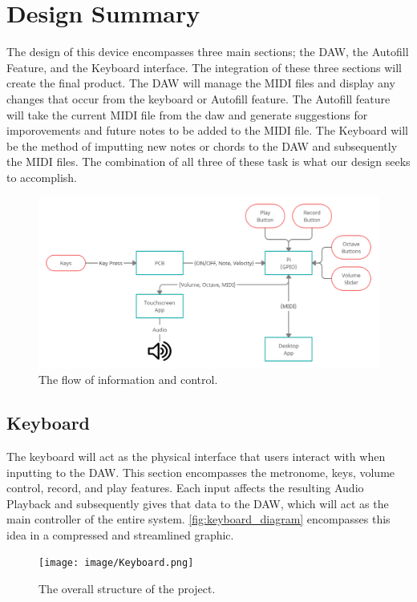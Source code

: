 \section{Design Summary}

The design of this device encompasses three main sections; the DAW, the Autofill Feature,
and the Keyboard interface. The integration of these three sections will create the final
product. The DAW will manage the MIDI files and display any changes that occur from the
keyboard or Autofill feature. The Autofill feature will take the current MIDI file from
the daw and generate suggestions for imporovements and future notes to be added to the
MIDI file. The Keyboard will be the method of imputting new notes or chords to the DAW and
subsequently the MIDI files. The combination of all three of these task is what our design
seeks to accomplish.

\begin{figure}[h!]
  \centering
  \includegraphics[width=\linewidth]{image/BlockDiagram.png}
  \caption{The flow of information and control.}
  \label{fig:block_diagram}
\end{figure}

\newpage
\subsection{Keyboard}

The keyboard will act as the physical interface that users interact with when inputting to
the DAW. This section encompasses the metronome, keys, volume control, record, and play
features. Each input affects the resulting Audio Playback and subsequently gives that data
to the DAW, which will act as the main controller of the entire system.
\autoref{fig:keyboard_diagram} encompasses this idea in a compressed and streamlined
graphic.

\begin{figure}[h!]
  \centering
  \texttt{[image: image/Keyboard.png]}
  \caption{The overall structure of the project.}
  \label{fig:keyboard_diagram}
\end{figure}

